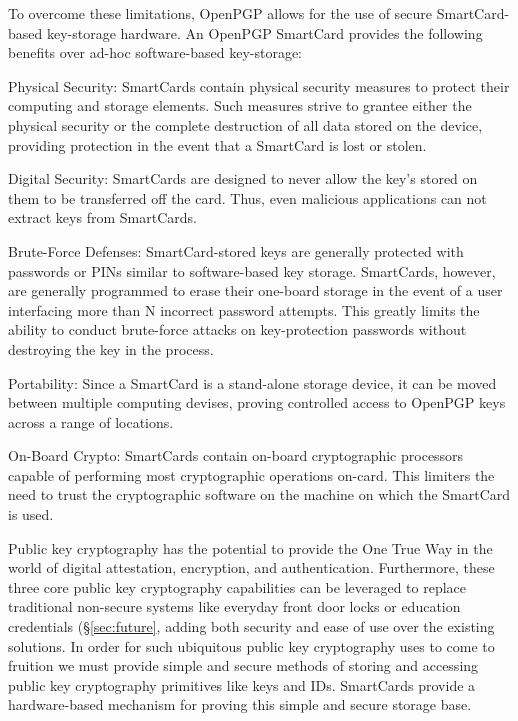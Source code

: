 \documentclass[11pt, twocolumn]{article}
\newenvironment{packed_desc}{
\begin{description}
  \setlength{\itemsep}{1pt}
  \setlength{\parskip}{0pt}
  \setlength{\parsep}{0pt}
}{\end{description}}
\begin{document}
To overcome these limitations, OpenPGP allows for the use of secure
SmartCard-based key-storage hardware. An OpenPGP SmartCard provides
the following benefits over ad-hoc software-based key-storage:

\begin{packed_desc}
\item{Physical Security:} SmartCards contain physical security
  measures to protect their computing and storage elements. Such
  measures strive to grantee either the physical security or the
  complete destruction of all data stored on the device, providing
  protection in the event that a SmartCard is lost or stolen.
\item{Digital Security:} SmartCards are designed to never allow the
  key's stored on them to be transferred off the card. Thus, even
  malicious applications can not extract keys from SmartCards.
\item{Brute-Force Defenses:} SmartCard-stored keys are generally
  protected with passwords or PINs similar to software-based key
  storage. SmartCards, however, are generally programmed to erase
  their one-board storage in the event of a user interfacing more than
  N incorrect password attempts. This greatly limits the ability to
  conduct brute-force attacks on key-protection passwords without
  destroying the key in the process.
\item{Portability:} Since a SmartCard is a stand-alone storage device,
  it can be moved between multiple computing devises, proving
  controlled access to OpenPGP keys across a range of locations.
\item{On-Board Crypto:} SmartCards contain on-board cryptographic
  processors capable of performing most cryptographic operations
  on-card. This limiters the need to trust the cryptographic software
  on the machine on which the SmartCard is used.
\end{packed_desc}

Public key cryptography has the potential to provide the One True
Way\texttrademark{} in the world of digital attestation, encryption, and
authentication. Furthermore, these three core public key cryptography
capabilities can be leveraged to replace traditional non-secure
systems like everyday front door locks or education credentials
(\S\ref{sec:future}, adding both security and ease of use over the
existing solutions. In order for such ubiquitous public key
cryptography uses to come to fruition we must provide simple and
secure methods of storing and accessing public key cryptography
primitives like keys and IDs. SmartCards provide a hardware-based
mechanism for proving this simple and secure storage base.
\end{document}
